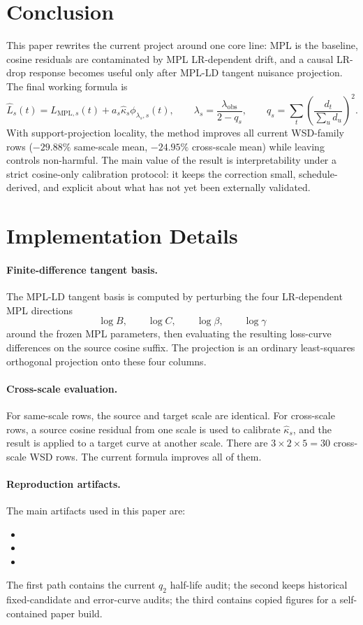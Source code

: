 \documentclass{article}
\newcommand{\MPL}{\mathrm{MPL}}
\newcommand{\obs}{\mathrm{obs}}
\begin{document}
\section{Conclusion}
This paper rewrites the current project around one core line: MPL is the baseline, cosine
residuals are contaminated by MPL LR-dependent drift, and a causal LR-drop response becomes
useful only after MPL-LD tangent nuisance projection.  The final working formula is
\[
  \widehat L_s(t)=L_{\MPL,s}(t)+a_s\widehat\kappa_s\phi_{\lambda_s,s}(t),
  \qquad
  \lambda_s=\frac{\lambda_{\obs}}{2-q_s},
  \qquad
  q_s=\sum_t\left(\frac{d_t}{\sum_u d_u}\right)^2 .
\]
With support-projection locality, the method improves all current WSD-family rows
(\(-29.88\%\) same-scale mean, \(-24.95\%\) cross-scale mean) while leaving controls
non-harmful.  The main value of the result is interpretability under a strict cosine-only
calibration protocol: it keeps the correction small, schedule-derived, and explicit about
what has not yet been externally validated.

\appendix
\section{Implementation Details}
\paragraph{Finite-difference tangent basis.}
The MPL-LD tangent basis is computed by perturbing the four LR-dependent MPL directions
\[
  \log B,\qquad \log C,\qquad \log\beta,\qquad \log\gamma
\]
around the frozen MPL parameters, then evaluating the resulting loss-curve differences on
the source cosine suffix.  The projection is an ordinary least-squares orthogonal projection
onto these four columns.

\paragraph{Cross-scale evaluation.}
For same-scale rows, the source and target scale are identical.  For cross-scale rows, a
source cosine residual from one scale is used to calibrate \(\widehat\kappa_s\), and the
result is applied to a target curve at another scale.  There are \(3\times2\times5=30\)
cross-scale WSD rows.  The current formula improves all of them.

\paragraph{Reproduction artifacts.}
The main artifacts used in this paper are:
\begin{itemize}\itemsep1pt
  \item {}
  \item {}
  \item {}
\end{itemize}
The first path contains the current \(q_2\) half-life audit; the second keeps historical
fixed-candidate and error-curve audits; the third contains copied figures for a
self-contained paper build.
\end{document}
